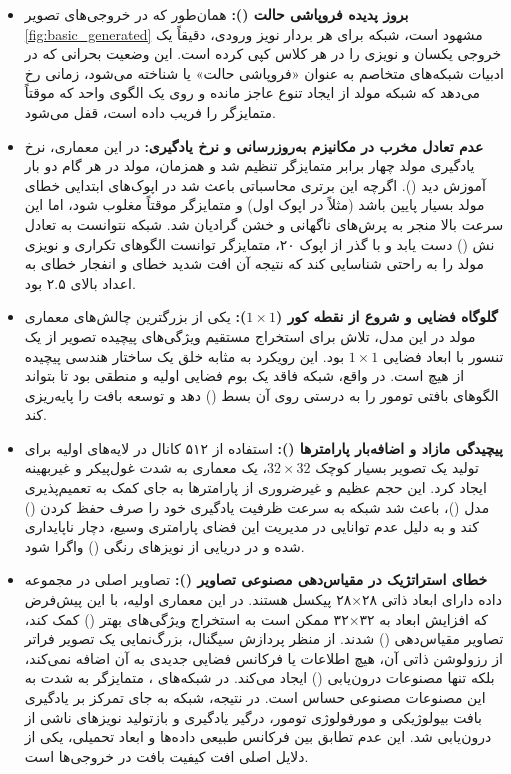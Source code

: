 \documentclass{article}
\begin{document}
\begin{itemize}
	\item \textbf{بروز پدیده فروپاشی حالت ():} همان‌طور که در خروجی‌های تصویر \ref{fig:basic_generated} مشهود است، شبکه برای هر بردار نویز ورودی، دقیقاً یک خروجی یکسان و نویزی را در هر کلاس کپی کرده است. این وضعیت بحرانی که در ادبیات شبکه‌های متخاصم به عنوان «فروپاشی حالت» یا  شناخته می‌شود، زمانی رخ می‌دهد که شبکه مولد از ایجاد تنوع عاجز مانده و روی یک الگوی واحد که موقتاً متمایزگر را فریب داده است، قفل می‌شود.
	
	\item \textbf{عدم تعادل مخرب در مکانیزم به‌روزرسانی و نرخ یادگیری:} در این معماری، نرخ یادگیری مولد چهار برابر متمایزگر تنظیم شد و همزمان، مولد در هر گام دو بار آموزش دید (). اگرچه این برتری محاسباتی باعث شد در اپوک‌های ابتدایی خطای مولد بسیار پایین باشد (مثلاً  در اپوک اول) و متمایزگر موقتاً مغلوب شود، اما این سرعت بالا منجر به پرش‌های ناگهانی و خشن گرادیان شد. شبکه نتوانست به تعادل نش () دست یابد و با گذر از اپوک ۲۰، متمایزگر توانست الگوهای تکراری و نویزی مولد را به راحتی شناسایی کند که نتیجه آن افت شدید خطای  و انفجار خطای  به اعداد بالای ۲.۵ بود.
	
	\item \textbf{گلوگاه فضایی و شروع از نقطه کور ($1 \times 1$):} یکی از بزرگترین چالش‌های معماری مولد در این مدل، تلاش برای استخراج مستقیم ویژگی‌های پیچیده تصویر از یک تنسور با ابعاد فضایی $1 \times 1$ بود. این رویکرد به مثابه خلق یک ساختار هندسی پیچیده از هیچ است. در واقع، شبکه فاقد یک بوم فضایی اولیه و منطقی  بود تا بتواند الگوهای بافتی تومور را به درستی روی آن بسط () دهد و توسعه بافت را پایه‌ریزی کند.
	
	\item \textbf{پیچیدگی مازاد و اضافه‌بار پارامترها ():} استفاده از ۵۱۲ کانال در لایه‌های اولیه برای تولید یک تصویر بسیار کوچک $32 \times 32$، یک معماری به شدت غول‌پیکر و غیربهینه ایجاد کرد. این حجم عظیم و غیرضروری از پارامترها به جای کمک به تعمیم‌پذیری مدل ()، باعث شد شبکه به سرعت ظرفیت یادگیری خود را صرف حفظ کردن () کند و به دلیل عدم توانایی در مدیریت این فضای پارامتری وسیع، دچار ناپایداری شده و در دریایی از نویزهای رنگی () واگرا شود.
	
	\item \textbf{خطای استراتژیک در مقیاس‌دهی مصنوعی تصاویر ():}
	تصاویر اصلی در مجموعه داده  دارای ابعاد ذاتی ۲۸×۲۸ پیکسل هستند. در این معماری اولیه، با این پیش‌فرض که افزایش ابعاد به ۳۲×۳۲ ممکن است به استخراج ویژگی‌های بهتر () کمک کند، تصاویر مقیاس‌دهی () شدند. 
	از منظر پردازش سیگنال، بزرگ‌نمایی یک تصویر فراتر از رزولوشن ذاتی آن، هیچ اطلاعات یا فرکانس فضایی جدیدی به آن اضافه نمی‌کند، بلکه تنها مصنوعات درون‌یابی () ایجاد می‌کند. در شبکه‌های ، متمایزگر به شدت به این مصنوعات مصنوعی حساس است. در نتیجه، شبکه به جای تمرکز بر یادگیری بافت بیولوژیکی و مورفولوژی تومور، درگیر یادگیری و بازتولید نویزهای ناشی از درون‌یابی شد. این عدم تطابق بین فرکانس طبیعی داده‌ها و ابعاد تحمیلی، یکی از دلایل اصلی افت کیفیت بافت در خروجی‌ها است.
\end{itemize}
\end{document}
